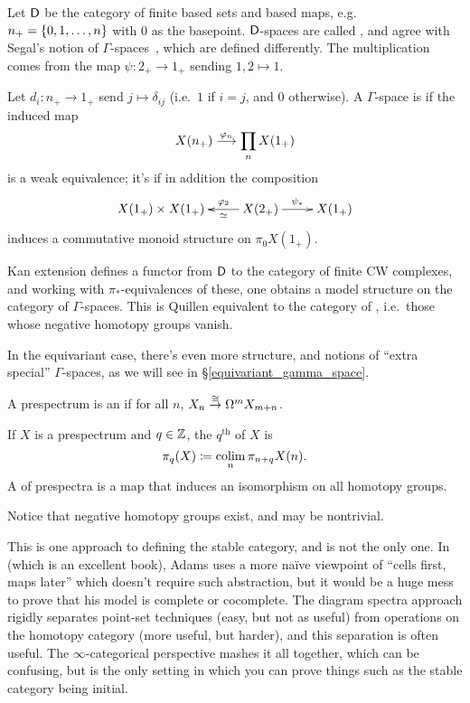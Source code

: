 \begin{exm}
\label{gamma_spaces}
Let $\mathsf D$ be the category of finite based sets and based maps, e.g.\ $n_+ = \{0,1,\dotsc,n\}$ with $0$ as the
basepoint. $\mathsf D$-spaces are called , and agree with Segal's notion of
$\Gamma$-spaces~\cite{SegalGamma}, which are defined differently. The multiplication comes from the map $\psi\colon
2_+\to 1_+$ sending $1,2\mapsto 1$.

Let $d_i:n_+\to 1_+$ send $j\mapsto\delta_{ij}$ (i.e.\ $1$ if $i = j$, and $0$ otherwise). A $\Gamma$-space is
 if the induced map
\[X(n_+)\stackrel{\varphi_n}{\longrightarrow} \prod_n X(1_+)\]
is a weak equivalence; it's  if in addition the composition
\[\xymatrix{
	X(1_+)\times X(1_+) & X(2_+)\ar[l]^-\simeq_-{\vp_2}\ar[r]^{\psi_*} &X(1_+)
}\]
induces a commutative monoid structure on $\pi_0 X(1_+)$.

Kan extension defines a functor from $\mathsf D$ to the category of finite CW complexes, and working with
$\pi_*$-equivalences of these, one obtains a model structure on the category of $\Gamma$-spaces. This is Quillen
equivalent to the category of , i.e.\ those whose negative homotopy
groups vanish.
\end{exm}
In the equivariant case, there's even more structure, and notions of ``extra special'' $\Gamma$-spaces, as we will
see in \S\ref{equivariant_gamma_space}.
\begin{defn}
A prespectrum is an  if for all $n$,
$X_n\stackrel\cong\to\Omega^mX_{m+n}$.
\end{defn}
\begin{defn}
If $X$ is a prespectrum and $q\in\mathbb Z$, the $q^{\text{th}}$ 
of $X$ is
\[\pi_q(X)\coloneqq \operatorname*{colim}_n \pi_{n+q}X(n).\]
A  of prespectra is a map that induces an
isomorphism on all homotopy groups.
\end{defn}
Notice that negative homotopy groups exist, and may be nontrivial.
\begin{rem}
This is one approach to defining the stable category, and is not the only one. In~\cite{AdamsStableHomotopy} (which
is an excellent book), Adams uses a more naïve viewpoint of ``cells first, maps later'' which doesn't require such
abstraction, but it would be a huge mess to prove that his model is complete or cocomplete. The diagram spectra
approach rigidly separates point-set techniques (easy, but not as useful) from operations on the homotopy category
(more useful, but harder), and this separation is often useful. The $\infty$-categorical perspective mashes it all
together, which can be confusing, but is the only setting in which you can prove things such as the stable
category being initial.
\end{rem}
